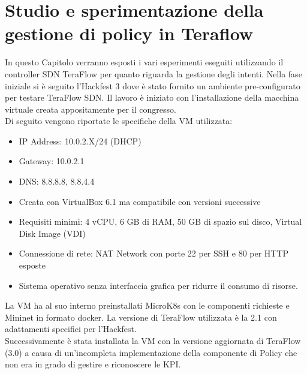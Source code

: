 \chapter{Studio e sperimentazione della gestione di policy in Teraflow}
\label{cap:policy}
In questo Capitolo verranno esposti i vari esperimenti eseguiti utilizzando il controller SDN TeraFlow per quanto riguarda la gestione degli intenti.
Nella fase iniziale si è seguito l'Hackfest 3 \cite{hackfest} dove è stato fornito un ambiente pre-configurato per testare TeraFlow SDN. 
Il lavoro è iniziato con l'installazione della macchina virtuale \cite{VM} creata appositamente per il congresso.
\\Di seguito vengono riportate le specifiche della VM utilizzata:
\begin{itemize}
    \item IP Address: 10.0.2.X/24 (DHCP)
    \item Gateway: 10.0.2.1
    \item DNS: 8.8.8.8, 8.8.4.4
    \item Creata con VirtualBox 6.1 ma compatibile con versioni successive
    \item Requisiti minimi: 4 vCPU, 6 GB di RAM, 50 GB di spazio sul disco, Virtual Disk Image (VDI)
    \item Connessione di rete: NAT Network con porte 22 per SSH e 80 per HTTP esposte
    \item Sistema operativo senza interfaccia grafica per ridurre il consumo di risorse.
\end{itemize}
La VM ha al suo interno preinstallati MicroK8s con le componenti richieste e Mininet in formato docker.
La versione di TeraFlow utilizzata è la 2.1 con adattamenti specifici per l'Hackfest.
\\Successivamente è stata installata la VM con la versione aggiornata di TeraFlow (3.0) a causa di un'incompleta implementazione della componente di Policy che non era in grado di gestire e riconoscere le KPI.
